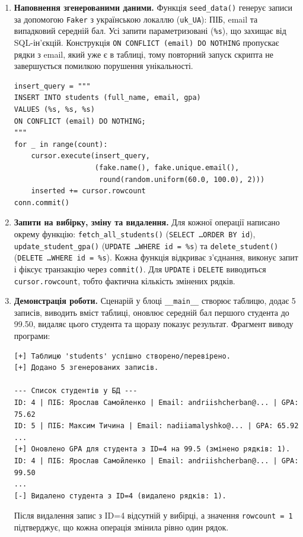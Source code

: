 \begin{enumerate}
  \item \textbf{Наповнення згенерованими даними.} Функція \texttt{seed\_data()} генерує записи за допомогою \texttt{Faker} з українською локаллю (\texttt{uk\_UA}): ПІБ, email та випадковий середній бал. Усі запити параметризовані (\texttt{\%s}), що захищає від SQL-ін'єкцій. Конструкція \texttt{ON CONFLICT (email) DO NOTHING} пропускає рядки з email, який уже є в таблиці, тому повторний запуск скрипта не завершується помилкою порушення унікальності.
\begin{Verbatim}
insert_query = """
INSERT INTO students (full_name, email, gpa)
VALUES (%s, %s, %s)
ON CONFLICT (email) DO NOTHING;
"""
for _ in range(count):
    cursor.execute(insert_query,
                   (fake.name(), fake.unique.email(),
                    round(random.uniform(60.0, 100.0), 2)))
    inserted += cursor.rowcount
conn.commit()
\end{Verbatim}

  \item \textbf{Запити на вибірку, зміну та видалення.} Для кожної операції написано окрему функцію: \texttt{fetch\_all\_students()} (\texttt{SELECT \dots ORDER BY id}), \texttt{update\_student\_gpa()} (\texttt{UPDATE \dots WHERE id = \%s}) та \texttt{delete\_student()} (\texttt{DELETE \dots WHERE id = \%s}). Кожна функція відкриває з'єднання, виконує запит і фіксує транзакцію через \texttt{commit()}. Для \texttt{UPDATE} і \texttt{DELETE} виводиться \texttt{cursor.rowcount}, тобто фактична кількість змінених рядків.

  \item \textbf{Демонстрація роботи.} Сценарій у блоці \texttt{\_\_main\_\_} створює таблицю, додає 5 записів, виводить вміст таблиці, оновлює середній бал першого студента до 99.50, видаляє цього студента та щоразу показує результат. Фрагмент виводу програми:
\begin{Verbatim}
[+] Таблицю 'students' успішно створено/перевірено.
[+] Додано 5 згенерованих записів.

--- Список студентів у БД ---
ID: 4 | ПІБ: Ярослав Самойленко | Email: andriishcherban@... | GPA: 75.62
ID: 5 | ПІБ: Максим Тичина | Email: nadiiamalyshko@... | GPA: 65.92
...
[+] Оновлено GPA для студента з ID=4 на 99.5 (змінено рядків: 1).
ID: 4 | ПІБ: Ярослав Самойленко | Email: andriishcherban@... | GPA: 99.50
...
[-] Видалено студента з ID=4 (видалено рядків: 1).
\end{Verbatim}
  Після видалення запис з ID=4 відсутній у вибірці, а значення \texttt{rowcount = 1} підтверджує, що кожна операція змінила рівно один рядок.
\end{enumerate}

